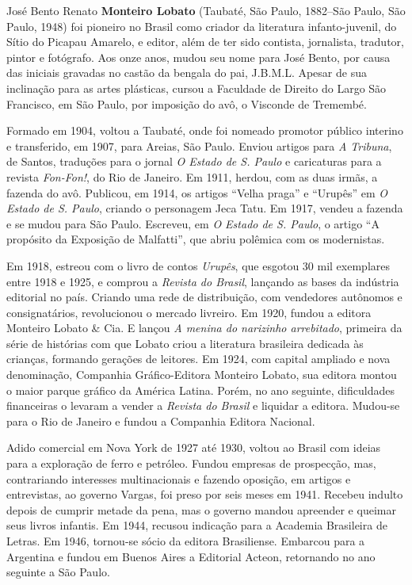 José Bento Renato \textbf{Monteiro Lobato} (Taubaté, São Paulo, 1882--São Paulo, São Paulo, 1948) foi pioneiro no Brasil como criador da
literatura infanto-juvenil, do Sítio do Picapau Amarelo, e editor, além
de ter sido contista, jornalista, tradutor, pintor e fotógrafo. Aos onze
anos, mudou seu nome para José Bento, por causa das iniciais gravadas no
castão da bengala do pai, J.B.M.L. Apesar de sua inclinação para as
artes plásticas, cursou a Faculdade de Direito do Largo São Francisco,
em São Paulo, por imposição do avô, o Visconde de Tremembé.

Formado em 1904, voltou a Taubaté, onde foi nomeado promotor público
interino e transferido, em 1907, para Areias, São Paulo. Enviou artigos
para \emph{A Tribuna}, de Santos, traduções para o jornal \emph{O Estado
de S. Paulo} e caricaturas para a revista \emph{Fon-Fon!}, do Rio de
Janeiro. Em 1911, herdou, com as duas irmãs, a fazenda do avô. Publicou,
em 1914, os artigos ``Velha praga'' e ``Urupês'' em \emph{O Estado de S.
Paulo}, criando o personagem Jeca Tatu. Em 1917, vendeu a fazenda e se
mudou para São Paulo. Escreveu, em \emph{O Estado de S. Paulo}, o artigo
``A propósito da Exposição de Malfatti'', que abriu polêmica com os
modernistas.

Em 1918, estreou com o livro de contos \emph{Urupês}, que esgotou 30 mil
exemplares entre 1918 e 1925, e comprou a \emph{Revista do Brasil},
lançando as bases da indústria editorial no país. Criando uma rede de
distribuição, com vendedores autônomos e consignatários, revolucionou o
mercado livreiro. Em 1920, fundou a editora Monteiro Lobato \& Cia. E
lançou \emph{A menina do narizinho arrebitado}, primeira da série de
histórias com que Lobato criou a literatura brasileira dedicada às
crianças, formando gerações de leitores. Em 1924, com capital ampliado e
nova denominação, Companhia Gráfico-Editora Monteiro Lobato, sua editora
montou o maior parque gráfico da América Latina. Porém, no ano seguinte,
dificuldades financeiras o levaram a vender a \emph{Revista do Brasil} e
liquidar a editora. Mudou-se para o Rio de Janeiro e fundou a Companhia
Editora Nacional.

Adido comercial em Nova York de 1927 até 1930, voltou ao Brasil com
ideias para a exploração de ferro e petróleo. Fundou empresas de
prospecção, mas, contrariando interesses multinacionais e fazendo
oposição, em artigos e entrevistas, ao governo Vargas, foi preso por
seis meses em 1941. Recebeu indulto depois de cumprir metade da pena,
mas o governo mandou apreender e queimar seus livros infantis. Em 1944,
recusou indicação para a Academia Brasileira de Letras. Em 1946,
tornou-se sócio da editora Brasiliense. Embarcou para a Argentina e
fundou em Buenos Aires a Editorial Acteon, retornando no ano seguinte a
São Paulo.

